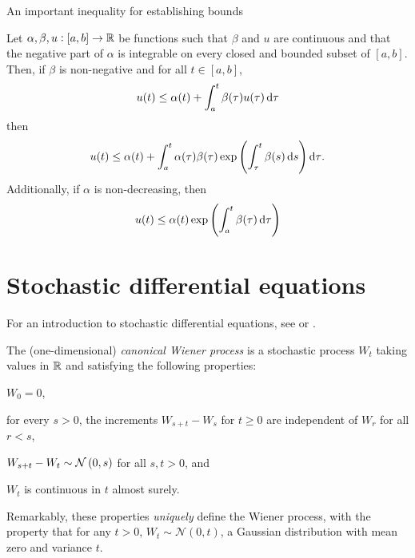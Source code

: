 An important inequality for establishing bounds

\begin{theorem}\label{thm:gronwall}
	Let \(\alpha, \beta, u: [a,b] \to \mathbb{R}\) be functions such that \(\beta\) and \(u\) are continuous and that the negative part of \(\alpha\) is integrable on every closed and bounded subset of \([a,b]\).
	Then, if \(\beta\) is non-negative and for all \(t \in [a,b]\),
	\[
		u(t) \leq \alpha(t) + \int_a^t{\beta(\tau)u(\tau)\dif\tau}
	\]
	then
	\[
		u(t) \leq \alpha(t) + \int_a^t{\alpha(\tau)\beta(\tau)\exp\left(\int_\tau^{t}{\beta(s)\dif s}\right)\dif\tau}.
	\]
	Additionally, if \(\alpha\) is non-decreasing, then
	\[
		u(t) \leq \alpha(t) \exp\left(\int_a^t{\beta(\tau)\dif\tau}\right)
	\]
\end{theorem}









\section{Stochastic differential equations}

For an introduction to stochastic differential equations, see \citet{Oksendal_2003_StochasticDifferentialEquations} or \citet{KallianpurSundar_2014_StochasticAnalysisDiffusion}.


\begin{definition}\label{def:wiener}
	The (one-dimensional) \emph{canonical Wiener process} is a stochastic process \(W_t\) taking values in \(\mathbb{R}\) and satisfying the following properties:
	\begin{romanate}
		\item \(W_0 = 0\),
		\item for every \(s > 0\), the increments \(W_{s + t} - W_{s}\) for \(t \geq 0\) are independent of \(W_r\) for all \(r < s\),
		\item \(W_{s + t} - W_t \sim\mathcal{N}\left(0, s\right)\) for all \(s,t > 0\), and
		\item \(W_t\) is continuous in \(t\) almost surely.
	\end{romanate}
\end{definition}
Remarkably, these properties \emph{uniquely} define the Wiener process, with the property that for any \(t > 0\), \(W_t \sim \mathcal{N}\left(0, t\right)\), a Gaussian distribution with mean zero and variance \(t\).




